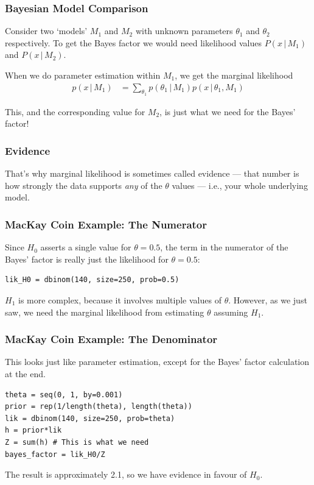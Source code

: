 \documentclass{beamer}
\newcommand{\given}{\,|\,}
\begin{document}
\begin{frame}
\frametitle{Bayesian Model Comparison}
Consider two `models' $M_1$ and $M_2$ with unknown parameters $\theta_1$
and $\theta_2$ respectively. To get the Bayes factor we would need likelihood
values $P(x \given M_1)$ and $P(x \given M_2)$.\\[0.5em]\pause

When we do parameter estimation within $M_1$, we get the marginal likelihood
\begin{align}
p(x \given M_1) &= \sum_{\theta_1} p(\theta_1 \given M_1)p(x \given \theta_1, M_1)
\end{align}

This, and the corresponding value for $M_2$, is just what we need for the Bayes' factor!

\end{frame}

\begin{frame}
\frametitle{Evidence}

That's why marginal likelihood
is sometimes called evidence --- that number is how strongly the data supports
{\em any} of the $\theta$ values --- i.e., your whole underlying model.

\end{frame}


\begin{frame}[fragile]
\frametitle{MacKay Coin Example: The Numerator}
Since $H_0$ asserts a single value for $\theta=0.5$, the term in the numerator
of the Bayes' factor is really just the likelihood for $\theta=0.5$:
\begin{verbatim}
lik_H0 = dbinom(140, size=250, prob=0.5)
\end{verbatim}
\pause

$H_1$ is more complex, because it involves multiple values of $\theta$.
However, as we just saw, we need the marginal likelihood from estimating $\theta$ assuming $H_1$.
\end{frame}

\begin{frame}[fragile]
\frametitle{MacKay Coin Example: The Denominator}
This looks just like parameter estimation, except for the Bayes' factor
calculation at the end.
\begin{verbatim}
theta = seq(0, 1, by=0.001)
prior = rep(1/length(theta), length(theta))
lik = dbinom(140, size=250, prob=theta)
h = prior*lik
Z = sum(h) # This is what we need
bayes_factor = lik_H0/Z
\end{verbatim}
\pause
The result is approximately 2.1, so we have evidence in favour of
$H_0$.

\end{frame}
\end{document}
